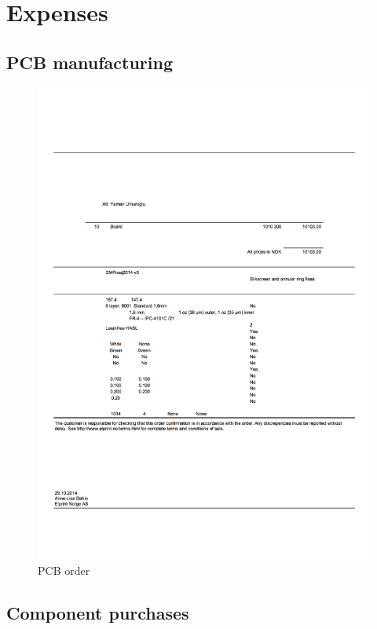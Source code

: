 \documentclass[../main/report.tex]{subfiles}
\begin{document}
\chapter{Expenses}

\newpage

\section{PCB manufacturing}

\begin{figure}[H]
    \centering
    \includegraphics[width=\textwidth]{../appendix/assets/pcb-purchase.jpg}
    \caption{PCB order}
    \label{fig:pcb-order}
\end{figure}


\section{Component purchases}
\end{document}
